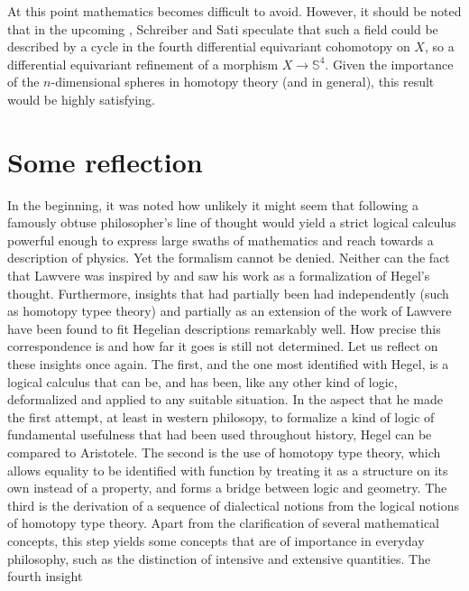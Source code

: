 \documentclass{article}
\begin{document}
At this point mathematics becomes difficult to avoid. However, it should be noted that in the upcoming
\cite{SSS}, Schreiber and Sati speculate that such a field could be described by a cycle in the fourth
differential equivariant cohomotopy on $X$, so a differential equivariant refinement of a morphism $X\rightarrow
\mathbb{S}^4$. Given the importance of the $n$-dimensional spheres in homotopy theory (and in general),
this result would be highly satisfying.













\section{Some reflection}
In the beginning, it was noted how unlikely it might seem that following a famously obtuse philosopher's
line of thought would yield a strict logical calculus powerful enough to express large swaths of mathematics
and reach towards a description of physics. Yet the formalism cannot be denied. Neither can the fact that
Lawvere was inspired by and saw his work as a formalization of Hegel's thought. Furthermore, insights
that had partially been had independently (such as homotopy typee theory) and partially as an extension
of the work of Lawvere have been found to fit Hegelian descriptions remarkably well. How precise this
correspondence is and how far it goes is still not determined. Let us reflect on these insights once again.
The first, and the one most identified with Hegel, is a logical calculus that can be, and has been, like
any other kind of logic, deformalized and applied to any suitable situation. In the aspect that he made
the first attempt, at least in western philosopy, to formalize a kind of logic of fundamental usefulness
that had been used throughout history, Hegel can be compared to Aristotele. The second is the use of homotopy
type theory, which allows equality to be identified with function by treating it as a structure on its
own instead of a property, and forms a bridge between logic and geometry. The third is the derivation
of a sequence of dialectical notions from the logical notions of homotopy type theory. Apart from the
clarification of several mathematical concepts, this step yields some concepts that are of importance
in everyday philosophy, such as the distinction of intensive and extensive quantities. The fourth insight
\end{document}
